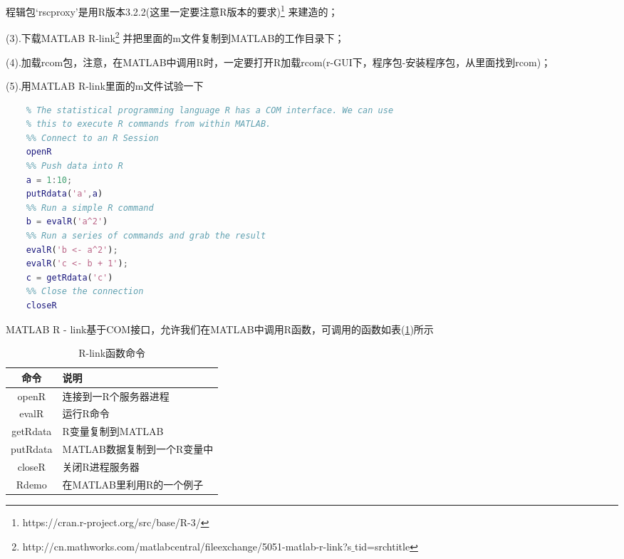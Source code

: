     程辑包‘rscproxy’是用R版本3.2.2(这里一定要注意R版本的要求)\footnote{https://cran.r-project.org/src/base/R-3/} 来建造的；
    \par
    \par
    (3).下载MATLAB R-link\footnote{http://cn.mathworks.com/matlabcentral/fileexchange/5051-matlab-r-link?s$\_$tid=srchtitle}
    并把里面的m文件复制到MATLAB的工作目录下；
    \par
    (4).加载rcom包，注意，在MATLAB中调用R时，一定要打开R加载rcom(r-GUI下，程序包-安装程序包，从里面找到rcom)；
    \par
    (5).用MATLAB R-link里面的m文件试验一下
    \begin{lstlisting}[language = Matlab]
    %% Connecting MATLAB to R
    % The statistical programming language R has a COM interface. We can use
    % this to execute R commands from within MATLAB.
    %% Connect to an R Session
    openR
    %% Push data into R
    a = 1:10;
    putRdata('a',a)
    %% Run a simple R command
    b = evalR('a^2')
    %% Run a series of commands and grab the result
    evalR('b <- a^2');
    evalR('c <- b + 1');
    c = getRdata('c')
    %% Close the connection
    closeR
    \end{lstlisting}
    \par
    MATLAB R - link基于COM接口，允许我们在MATLAB中调用R函数，可调用的函数如表(\ref{R-link函数命令})所示
    \begin{table}[H]
    \caption{R-link函数命令}
    \label{R-link函数命令}
    \centering
    \begin{tabular}{c|l}
        \toprule
        命令 & 说明  \\
        \midrule
        openR&     连接到一R个服务器进程\\
        evalR&     运行R命令\\
        getRdata&  R变量复制到MATLAB\\
        putRdata&  MATLAB数据复制到一个R变量中\\
        closeR&    关闭R进程服务器\\
        Rdemo&     在MATLAB里利用R的一个例子\\
        \bottomrule
    \end{tabular}
    \end{table}
